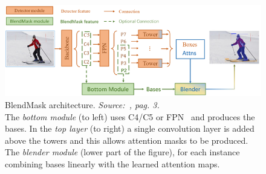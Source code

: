 \documentclass[10pt,twocolumn,letterpaper]{article}
\begin{document}
\begin{figure}[H]
\centering
  \includegraphics[width=1\linewidth]{./image/blendmask.png}
  \caption{BlendMask architecture. \textit{Source:~\cite{Authors2_BlendMask}, pag. 3.} \\ The \textit{bottom module} (to left) uses C4/C5 or FPN~\cite{FPN} and produces the bases. In the \textit{top layer} (to right) a single convolution layer is added above the towers and this allows attention masks to be produced. The \textit{blender module} (lower part of the figure), for each instance combining bases linearly with the learned attention maps.}
  \label{fig:blendmask}
\noindent
\end{figure}
\end{document}
